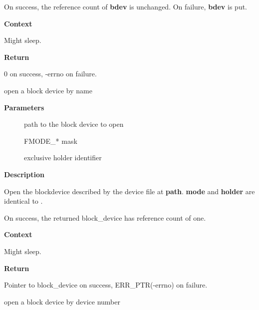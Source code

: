 \documentclass[a4paper,8pt,english]{sphinxmanual}
\begin{document}
On success, the reference count of \textbf{bdev} is unchanged.  On failure,
\textbf{bdev} is put.

\textbf{Context}

Might sleep.

\textbf{Return}

0 on success, -errno on failure.

\begin{fulllineitems}
\label{filesystems/index:c.blkdev_get_by_path}
open a block device by name

\end{fulllineitems}


\textbf{Parameters}
\begin{description}
\item[{}] \leavevmode
path to the block device to open

\item[{}] \leavevmode
FMODE\_* mask

\item[{}] \leavevmode
exclusive holder identifier

\end{description}

\textbf{Description}

Open the blockdevice described by the device file at \textbf{path}.  \textbf{mode}
and \textbf{holder} are identical to {\hyperref[filesystems/index:c.blkdev_get]{\emph{}}}.

On success, the returned block\_device has reference count of one.

\textbf{Context}

Might sleep.

\textbf{Return}

Pointer to block\_device on success, ERR\_PTR(-errno) on failure.

\begin{fulllineitems}
\label{filesystems/index:c.blkdev_get_by_dev}
open a block device by device number

\end{fulllineitems}
\end{document}

